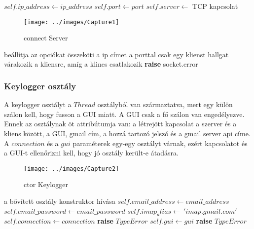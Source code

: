 \documentclass[a4paper, 11pt]{article}
\begin{document}
\begin{algorithmic}[H]
	\State $self.ip\_address \gets ip\_address$
	\State $self.port \gets port$
	\State $self.server \gets$ TCP kapcsolat
\EndFunction
\end{algorithmic}

\begin{figure}[H]
\centering
\texttt{[image: ../images/Capture1]}
\caption{connect Server}
\label{fig:connect}
\end{figure}

\begin{algorithmic}[H]
	\State beállítja az opciókat
	\State összeköti a ip címet a porttal
	\State csak egy klienst hallgat
	\try
		\State várakozik a kliensre, amíg a klines csatlakozik
		\State \textbf{raise} socket.error
	\endtry
\EndFunction
\end{algorithmic}

\subsubsection{Keylogger osztály}\label{subsubsec:keyloggerclass}
A keylogger osztályt a $Thread$ osztályból van származtatva, mert egy külön szálon kell, hogy fusson a GUI miatt. A GUI csak a fő szálon van engedélyezve. Ennek az osztálynak öt attribútumja van: a létrejött kapcsolat a szerver és a kliens között, a GUI, gmail cím, a hozzá tartozó jelszó és a gmail server api címe. A $connection$ és a $gui$ paraméterek egy-egy osztályt várnak, ezért kapcsolatot és a GUI-t ellenőrizni kell, hogy jó osztály került-e átadásra.
\begin{figure}[H]
\centering
\texttt{[image: ../images/Capture2]}
\caption{ctor Keylogger}
\label{fig:ctorkeylogger}
\end{figure}

\begin{algorithmic}[H]
	\State a bővített osztály konstruktor hívása
	\State $self.email\_address \gets email\_address$
	\State $self.email\_password \gets email\_password$
	\State $self.imap_alias \gets\ 'imap.gmail.com'$
		\State $self.connection \gets connection$
	\Else
		\State \textbf{raise} $TypeError$
	\EndIf
		\State $self.gui \gets gui$
	\Else
		\State \textbf{raise} $TypeError$
	\EndIf
\EndFunction
\end{algorithmic}
\end{document}
